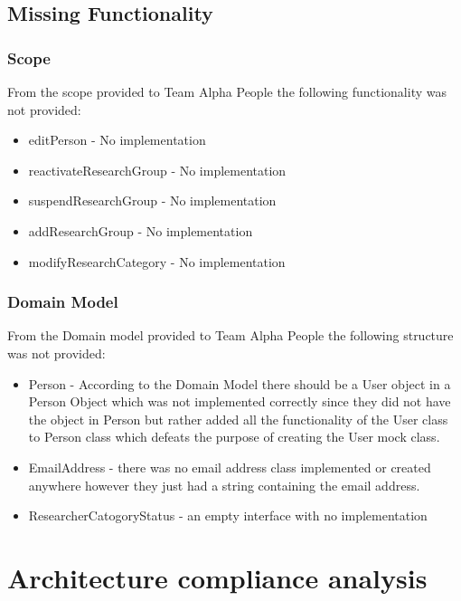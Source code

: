 \documentclass{article}
\begin{document}
    \subsection{Missing Functionality}
	\subsubsection{Scope}
	From the scope provided to Team Alpha People the following functionality was not provided:
	\begin{itemize}
		\item editPerson - No implementation
		\item reactivateResearchGroup - No implementation
		\item suspendResearchGroup - No implementation
		\item addResearchGroup - No implementation
		\item modifyResearchCategory - No implementation
	\end{itemize}
	
	\subsubsection{Domain Model}
	From the Domain model provided to Team Alpha People the following structure was not provided:
	\begin{itemize}
		\item Person - According to the Domain Model there should be a User object in a Person Object which was not implemented correctly since they did not have the object in Person but rather added all the functionality of the User class to Person class which defeats the purpose of creating the User mock class.
		\item EmailAddress - there was no email address class implemented or created anywhere however they just had a string containing the email address.
		\item ResearcherCatogoryStatus - an empty interface with no implementation
	 \end{itemize}
	 
      
    
    
    


\section{Architecture compliance analysis}
\end{document}
